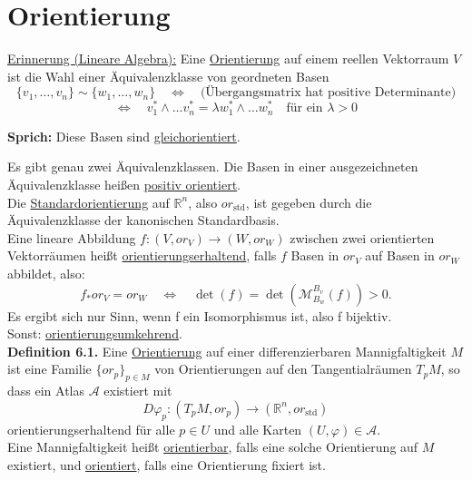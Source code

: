 \documentclass[fleqn, 12pt, letterpaper]{article}
\newcommand{\txt}[1]{\text{#1}}
\begin{document}

\section{Orientierung}

\underline{Erinnerung (Lineare Algebra):} Eine \underline{Orientierung} auf einem reellen Vektorraum \( V \) ist die Wahl einer Äquivalenzklasse von geordneten Basen
\[
\{v_1, \dots, v_n\} \sim \{w_1, \dots, w_n\}
\quad \Longleftrightarrow \quad
\text{(Übergangsmatrix hat positive Determinante)}
\]
\[\Longleftrightarrow \quad v_1^*\wedge\dots v_n^*=\lambda w_1^*\wedge \dots w_n^*\quad \txt{für ein } \lambda >0\]

\textbf{Sprich:} Diese Basen sind \underline{gleichorientiert}.

Es gibt genau zwei Äquivalenzklassen. Die Basen in einer ausgezeichneten Äquivalenzklasse heißen \underline{positiv orientiert}.\\

Die \underline{Standardorientierung} auf \( \mathbb{R}^n \), also \( or_{\mathrm{std}} \), ist gegeben durch die Äquivalenzklasse der kanonischen Standardbasis.\\

Eine lineare Abbildung \( f : (V, or_V) \to (W, or_W) \) zwischen zwei orientierten Vektorräumen heißt \underline{orientierungserhaltend}, falls \( f \) Basen in \( or_V \) auf Basen in \( or_W \) abbildet, also:
\[
f_* or_V = or_W \quad \Longleftrightarrow \quad \det(f)=\det(\mathcal{M}_{B_w}^{B_v}(f)) > 0.
\]
Es ergibt sich nur Sinn, wenn f ein Isomorphismus ist, also f bijektiv.\\
Sonst: \underline{orientierungsumkehrend}.\\

\textbf{Definition 6.1.}
Eine \underline{Orientierung} auf einer differenzierbaren Mannigfaltigkeit \( M \) ist eine Familie \( \{ or_p \}_{p \in M} \) von Orientierungen auf den Tangentialräumen \( T_p M \), so dass ein Atlas \( \mathcal{A} \) existiert mit
\[
D\varphi_p : (T_p M, or_p) \longrightarrow (\mathbb{R}^n, or_{\mathrm{std}})
\]
orientierungserhaltend für alle \( p \in U \) und alle Karten \( (U, \varphi) \in \mathcal{A} \).\\

Eine Mannigfaltigkeit heißt \underline{orientierbar}, falls eine solche Orientierung auf $M$ existiert, und \underline{orientiert}, falls eine Orientierung fixiert ist.
\end{document}

